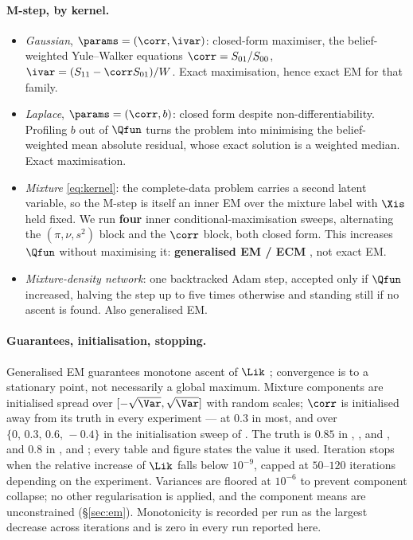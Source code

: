 \paragraph{M-step, by kernel.}
\begin{itemize}\itemsep2pt
\item \emph{Gaussian}, $\params=(\corr,\ivar)$: closed-form maximiser, the belief-weighted
      Yule--Walker equations $\corr = S_{01}/S_{00}$, $\ivar = (S_{11}-\corr S_{01})/W$. Exact
      maximisation, hence exact EM for that family.
\item \emph{Laplace}, $\params=(\corr,b)$: closed form despite non-differentiability. Profiling
      $b$ out of $\Qfun$ turns the problem into minimising the belief-weighted mean absolute
      residual, whose exact solution is a weighted median. Exact maximisation.
\item \emph{Mixture} \eqref{eq:kernel}: the complete-data problem carries a second latent
      variable, so the M-step is itself an inner EM over the mixture label with
      $\Xis$ held fixed. We run \textbf{four} inner conditional-maximisation sweeps, alternating
      the $(\pi,\nu,s^2)$ block and the $\corr$ block, both closed form. This increases $\Qfun$
      without maximising it: \textbf{generalised EM / ECM} \citep{meng1993}, not exact EM.
\item \emph{Mixture-density network}: one backtracked Adam step, accepted only if $\Qfun$
      increased, halving the step up to five times otherwise and standing still if no ascent is
      found. Also generalised EM.
\end{itemize}

\paragraph{Guarantees, initialisation, stopping.} Generalised EM guarantees monotone ascent of
$\Lik$ \citep{dempster1977,wu1983}; convergence is to a stationary point, not necessarily a global
maximum. Mixture components are initialised spread over $[-\sqrt{\Var}, \sqrt{\Var}]$ with random
scales; $\corr$ is initialised away from its truth in every experiment --- at $0.3$ in most, and
over $\{0,\,0.3,\,0.6,\,-0.4\}$ in the initialisation sweep of . The truth is
$0.85$ in , ,  and , and
$0.8$ in ,  and ; every table and figure
states the value it used. Iteration
stops when the relative increase of $\Lik$ falls below $10^{-9}$, capped at $50$--$120$
iterations depending on the experiment. Variances are floored at $10^{-6}$ to prevent component
collapse; no other regularisation is applied, and the component means are unconstrained
(\S\ref{sec:em}). Monotonicity is recorded per run as the largest decrease across iterations and
is zero in every run reported here.

